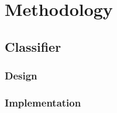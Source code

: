 
\section{Methodology}









\subsection{Classifier}
\subsubsection{Design}
\subsubsection{Implementation}